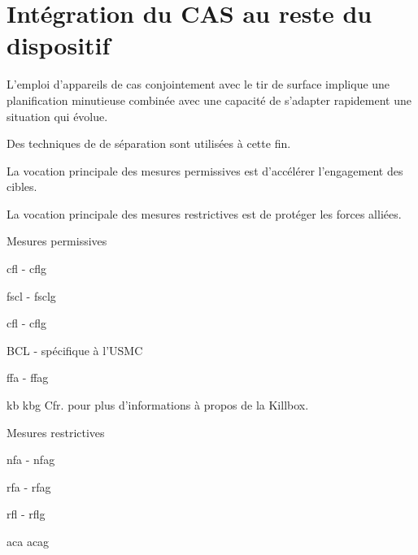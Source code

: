 \section{Intégration du CAS au reste du dispositif}

L'emploi d'appareils de \gls{cas} conjointement avec le tir de surface implique une planification minutieuse combinée avec une capacité de s'adapter rapidement une situation qui évolue.

Des techniques de de séparation sont utilisées à cette fin.

\begin{e1}
	\item La vocation principale des mesures permissives est d'accélérer l'engagement des cibles.
	\item La vocation principale des mesures restrictives est de protéger les forces alliées.
	\begin{e2}
		\item Mesures permissives
		\begin{e3}
			\item {} \gls{cfl} - \glsdesc{cflg}
			\item {} \gls{fscl} - \glsdesc{fsclg}
			\item {} \gls{cfl} - \glsdesc{cflg}
			\item BCL - spécifique à l'USMC
			\item {} \gls{ffa} - \glsdesc{ffag}
			\item {} \gls{kb}\eskip{} \glsdesc{kbg}\eskip{} Cfr.  pour plus d'informations à propos de la Killbox.
		\end{e3}
		\item Mesures restrictives
		\begin{e3}
			\item {} \gls{nfa} - \glsdesc{nfag}
			\item {} \gls{rfa} - \glsdesc{rfag}
			\item {} \gls{rfl} - \glsdesc{rflg}
			\item {} \gls{aca}\eskip{} \glsdesc{acag}
			\begin{e4}

\end{e4}
\end{e3}
\end{e2}
\end{e1}
